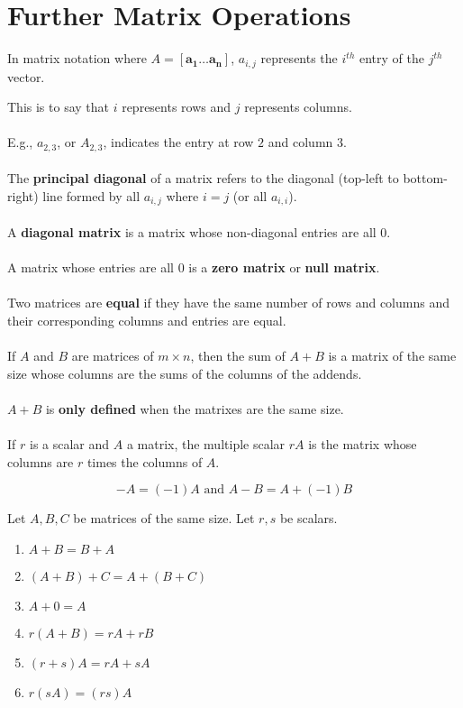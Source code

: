 \documentclass[12pt]{article}
\newcommand{\bt}[1]{\textbf{{#1}}}
\newcommand{\bm}[1]{\mathbf{{#1}}}
\begin{document}
\section*{Further Matrix Operations}

In matrix notation where $A = [\bm{a_1} \dots \bm{a_n}]$, $a_{i,j}$ represents the $i^{th}$ entry of the $j^{th}$ vector.

This is to say that $i$ represents rows and $j$ represents columns. \\ \\

E.g., $a_{2,3}$, or $A_{2,3}$, indicates the entry at row $2$ and column $3$. \\ \\

The \textbf{principal diagonal} of a matrix refers to the diagonal (top-left to
bottom-right) line formed by all $a_{i,j}$ where $i = j$ (or all $a_{i,i}$). \\ \\

A \bt{diagonal matrix} is a matrix whose non-diagonal entries are all $0$. \\ \\

A matrix whose entries are all $0$ is a \bt{zero matrix} or \bt{null matrix}. \\ \\

Two matrices are \textbf{equal} if they have the same number of rows and columns and their corresponding
columns and entries are equal. \\ \\

If $A$ and $B$ are matrices of $m \times n$, then the sum of $A + B$ is a matrix of the same size whose columns are the sums
of the columns of the addends. \\ \\

$A + B$ is \bt{only defined} when the matrixes are the same size. \\ \\

If $r$ is a scalar and $A$ a matrix, the multiple scalar $rA$ is the matrix whose
columns are $r$ times the columns of $A$.

$$-A = (-1)A \textrm{ and } A - B = A + (-1)B$$

Let $A, B, C$ be matrices of the same size. Let $r, s$ be scalars.

\begin{enumerate}
    \item $A + B = B + A$
    \item $(A + B) + C = A + (B + C)$
    \item $A + 0 = A$
    \item $r(A + B) = rA + rB$
    \item $(r + s)A = rA + sA$
    \item $r(sA) = (rs)A$
\end{enumerate}
\end{document}

